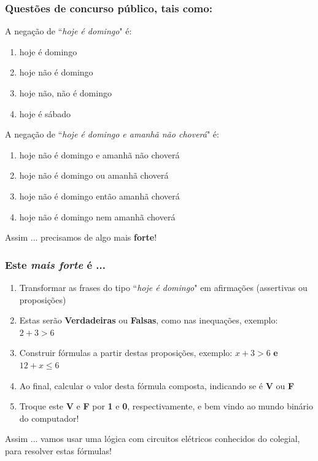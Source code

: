 \documentclass{beamer}
\begin{document}
\begin{frame}
\frametitle{Questões de concurso público, tais como:}

\begin{exampleblock}{A negação de ``\textit{hoje é domingo}"\/ é:}
\begin{enumerate}
  \item hoje é domingo
  \item hoje não é domingo
  \item hoje não, não é domingo
  \item hoje é sábado
\end{enumerate}
\end{exampleblock}

\pause
\begin{block}{A negação de ``\textit{hoje é domingo e amanhã não choverá}"\/ é:}
\begin{enumerate}
  \item hoje não é domingo e amanhã não choverá
  \item hoje não é domingo ou amanhã choverá
  \item hoje não é domingo então amanhã choverá
  \item hoje não é domingo nem amanhã choverá
\end{enumerate}
\end{block}
\pause
\begin{alertblock}{Assim ...}
precisamos de algo mais \textbf{forte}!
\end{alertblock}
\end{frame}

\begin{frame}
\frametitle{Este \textit{mais forte} é ...}

\begin{block}{}
\begin{enumerate}
  \item Transformar as frases do tipo ``\textit{hoje é domingo}" \/ em afirmações 
  (assertivas ou proposições)   
  \item Estas serão \textbf{Verdadeiras} ou \textbf{Falsas}, como nas inequações, exemplo: $2+3 > 6$
  \item Construir fórmulas a partir destas proposições, exemplo: $x + 3 > 6$ \textbf{e} $12 + x \le 6$ 
  \item Ao final, calcular o valor desta fórmula composta, indicando se é \textbf{V} ou \textbf{F}
  \item Troque este \textbf{V} e \textbf{F} por \textbf{1} e \textbf{0}, respectivamente,
  e bem vindo ao mundo binário do computador!

\end{enumerate}
\end{block}

\pause
\begin{alertblock}{Assim ...}
vamos usar uma lógica com circuitos elétricos conhecidos do colegial,
para resolver estas fórmulas!
\end{alertblock}


\end{frame}
\end{document}
